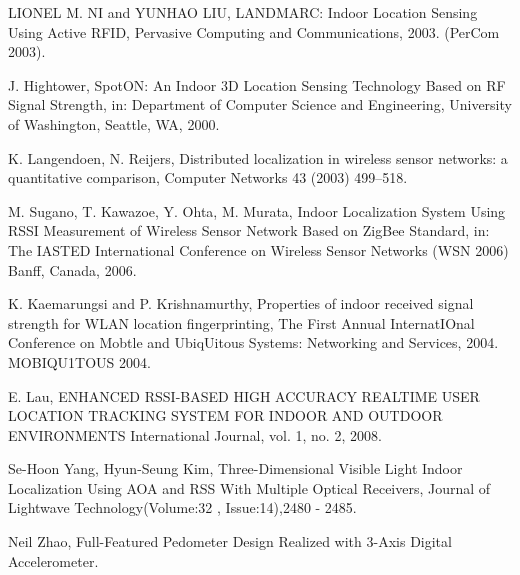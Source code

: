 \documentclass[conference]{IEEEtran}
\begin{document}
\begin{thebibliography}{1}
LIONEL M. NI and YUNHAO LIU, LANDMARC: Indoor Location Sensing Using Active RFID, Pervasive Computing and Communications, 2003. (PerCom 2003).

J. Hightower, SpotON: An Indoor 3D Location Sensing Technology Based on RF
Signal Strength, in: Department of Computer Science and Engineering,
University of Washington, Seattle, WA, 2000.

K. Langendoen, N. Reijers, Distributed localization in wireless sensor networks:
a quantitative comparison, Computer Networks 43 (2003) 499–518.

M. Sugano, T. Kawazoe, Y. Ohta, M. Murata, Indoor Localization System Using
RSSI Measurement of Wireless Sensor Network Based on ZigBee Standard, in:
The IASTED International Conference on Wireless Sensor Networks (WSN
2006) Banff, Canada, 2006.

K. Kaemarungsi and P. Krishnamurthy, Properties of indoor
received signal strength for WLAN location fingerprinting, The First Annual InternatIOnal Conference on Mobtle and UbiqUitous
Systems: Networking and Services, 2004. MOBIQU1TOUS 2004.

E. Lau, ENHANCED RSSI-BASED HIGH ACCURACY REALTIME USER LOCATION TRACKING SYSTEM FOR INDOOR AND OUTDOOR ENVIRONMENTS International Journal, vol. 1, no. 2, 2008. 

Se-Hoon Yang, Hyun-Seung Kim, Three-Dimensional Visible Light Indoor Localization Using AOA and RSS With Multiple Optical Receivers, Journal of Lightwave Technology(Volume:32 ,  Issue:14),2480 - 2485.

Neil Zhao, Full-Featured Pedometer Design Realized with 3-Axis Digital Accelerometer.

\end{thebibliography}

\end{document}
